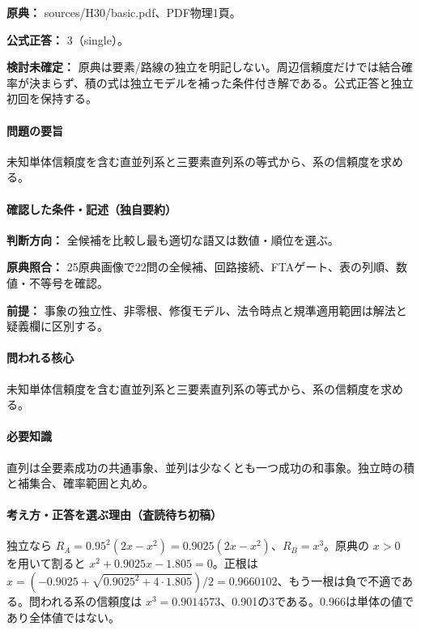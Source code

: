 \noindent\textbf{原典：} sources/H30/basic.pdf、PDF物理1頁。

\textbf{公式正答：} 3（single）。

\par\textbf{検討未確定：} 原典は要素/路線の独立を明記しない。周辺信頼度だけでは結合確率が決まらず、積の式は独立モデルを補った条件付き解である。公式正答と独立初回を保持する。

\paragraph{問題の要旨} 未知単体信頼度を含む直並列系と三要素直列系の等式から、系の信頼度を求める。

\paragraph{確認した条件・記述（独自要約）}\mbox{}\par

\noindent\textbf{判断方向：} 全候補を比較し最も適切な語又は数値・順位を選ぶ。\par

\noindent\textbf{原典照合：} 25原典画像で22問の全候補、回路接続、FTAゲート、表の列順、数値・不等号を確認。\par

\noindent\textbf{前提：} 事象の独立性、非零根、修復モデル、法令時点と規準適用範囲は解法と疑義欄に区別する。\par

\paragraph{問われる核心} 未知単体信頼度を含む直並列系と三要素直列系の等式から、系の信頼度を求める。

\paragraph{必要知識} 直列は全要素成功の共通事象、並列は少なくとも一つ成功の和事象。独立時の積と補集合、確率範囲と丸め。

\paragraph{考え方・正答を選ぶ理由（査読待ち初稿）} 独立なら \(R_A=0.95^2(2x-x^2)=0.9025(2x-x^2)\)、\(R_B=x^3\)。原典の \(x>0\) を用いて割ると \(x^2+0.9025x-1.805=0\)。正根は \(x=(-0.9025+\sqrt{0.9025^2+4\cdot1.805})/2=0.9660102\)、もう一根は負で不適である。問われる系の信頼度は \(x^3=0.9014573\)、0.901の3である。0.966は単体の値であり全体値ではない。

